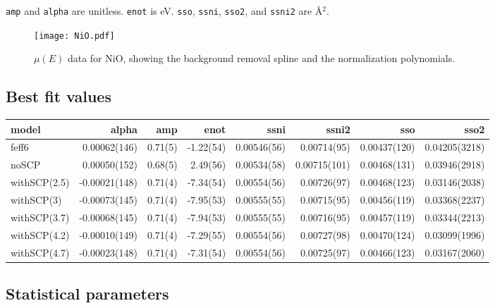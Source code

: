 \documentclass[11pt]{article}
\begin{document}
\texttt{amp} and \texttt{alpha} are unitless. \texttt{enot} is
eV. \texttt{sso}, \texttt{ssni}, \texttt{sso2}, and \texttt{ssni2} are
{\AA}$^2$.

\begin{figure}[h]
  \centering
  \texttt{[image: NiO.pdf]}
  \caption{$\mu(E)$ data for NiO, showing the background
    removal spline and the normalization polynomials.}
  \label{fig:nio-data}
\end{figure}

\subsection{Best fit values}
\label{sec:orgheadline8}

\begin{center}
  \footnotesize
  \begin{tabular}{lrrrrrrr}
    model & alpha & amp & enot & ssni & ssni2 & sso & sso2\\
    \hline
    feff6        & 0.00062(146)  & 0.71(5) & -1.22(54) & 0.00546(56) & 0.00714(95) & 0.00437(120) & 0.04205(3218)\\
    noSCP        & 0.00050(152)  & 0.68(5) & 2.49(56)  & 0.00534(58) & 0.00715(101)& 0.00468(131) & 0.03946(2918)\\
    withSCP(2.5) & -0.00021(148) & 0.71(4) & -7.34(54) & 0.00554(56) & 0.00726(97) & 0.00468(123) & 0.03146(2038)\\
    withSCP(3)   & -0.00073(145) & 0.71(4) & -7.95(53) & 0.00555(55) & 0.00715(95) & 0.00456(119) & 0.03368(2237)\\
    withSCP(3.7) & -0.00068(145) & 0.71(4) & -7.94(53) & 0.00555(55) & 0.00716(95) & 0.00457(119) & 0.03344(2213)\\
    withSCP(4.2) & -0.00010(149) & 0.71(4) & -7.29(55) & 0.00554(56) & 0.00727(98) & 0.00470(124) & 0.03099(1996)\\
    withSCP(4.7) & -0.00023(148) & 0.71(4) & -7.31(54) & 0.00554(56) & 0.00725(97) & 0.00466(123) & 0.03167(2060)\\
  \end{tabular}
\end{center}

\subsection{Statistical parameters}
\label{sec:orgheadline9}
\end{document}
